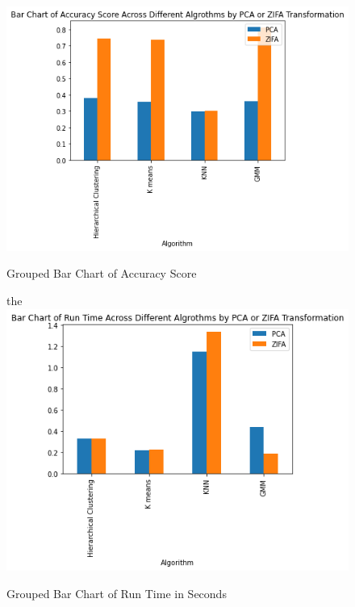 \documentclass[12pt]{article}
\theoremstyle{definition}
\begin{document}
\begin{figure}[h]
    \centering
    \includegraphics[scale=0.75]{Figure 1.png}
    \caption{Grouped Bar Chart of Accuracy Score}
    \label{fig:mesh1} the \\
    \includegraphics[scale=0.75]{Figure 2.png}
    \caption{Grouped Bar Chart of Run Time in Seconds}
    \label{fig:mesh1}
\end{figure}
\end{document}
